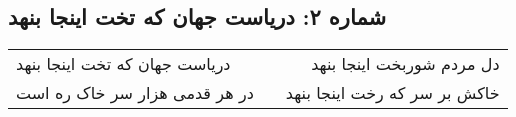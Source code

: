 \begin{center}
\section*{شماره ۲: دریاست جهان که تخت اینجا بنهد}
\label{sec:002}
\begin{longtable}{l p{0.5cm} r}
دریاست جهان که تخت اینجا بنهد
&&
دل مردم شوربخت اینجا بنهد
\\
در هر قدمی هزار سر خاک ره است
&&
خاکش بر سر که رخت اینجا بنهد
\\
\end{longtable}
\end{center}
